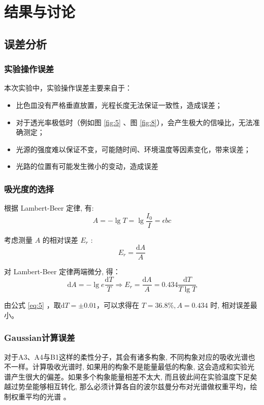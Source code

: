 \section{结果与讨论}

\subsection{误差分析}

\subsubsection{实验操作误差}

本次实验中，实验操作误差主要来自于：
\begin{itemize}
    \item 比色皿没有严格垂直放置，光程长度无法保证一致性，造成误差；
    \item 对于透光率极低时（例如图 \ref{fig:5} 、图 \ref{fig:8}），会产生极大的信噪比，无法准确测定；
    \item 光源的强度难以保证不变，可能随时间、环境温度等因素变化，带来误差；
    \item 光路的位置有可能发生微小的变动，造成误差
\end{itemize}

\subsubsection{吸光度的选择}

根据 Lambert-Beer 定律, 有:
$$
A=-\lg T=\lg \frac{I_0}{I}=\epsilon b c
$$

考虑测量 $A$ 的相对误差 $E_r$ :
$$
E_r=\frac{\mathrm{d} A}{A}
$$

对 Lambert-Beer 定律两端微分, 得：
\begin{equation}\label{eq:5}
    \mathrm{d} A=-\lg e \frac{\mathrm{d} T}{T} \Longrightarrow E_r=\frac{\mathrm{d} A}{A}=0.434 \frac{\mathrm{d} T}{T \lg T}
\end{equation}

由公式 \eqref{eq:5} ，取$\mathrm{d}T=\pm 0.01$，可以求得在 $T=36.8 \%, A=0.434$ 时, 相对误差最小。

\subsubsection{Gaussian计算误差}

对于A3、A4与B1这样的柔性分子，其会有诸多构象, 不同构象对应的吸收光谱也不一样。计算吸收光谱时, 如果用的构象不是能量最低的构象, 这会造成和实验光谱产生很大的偏差。如果多个构象能量相差不太大, 而且彼此间在实验温度下足矣越过势垒能够相互转化, 那么必须计算各自的波尔兹曼分布对光谱做权重平均，绘制权重平均的光谱 \cite{sober14,sober15}。


